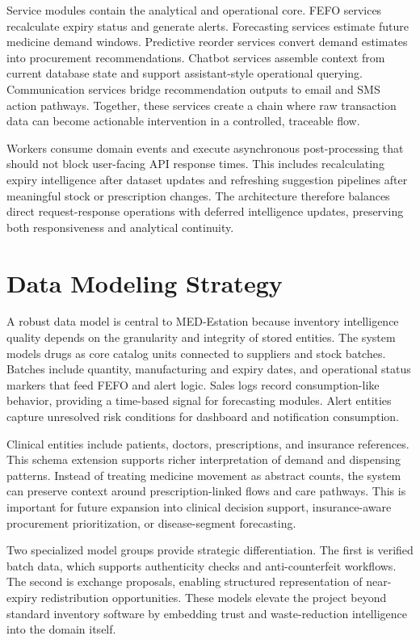 \documentclass[12pt,a4paper]{report}
\begin{document}
Service modules contain the analytical and operational core. FEFO services recalculate expiry status and generate alerts. Forecasting services estimate future medicine demand windows. Predictive reorder services convert demand estimates into procurement recommendations. Chatbot services assemble context from current database state and support assistant-style operational querying. Communication services bridge recommendation outputs to email and SMS action pathways. Together, these services create a chain where raw transaction data can become actionable intervention in a controlled, traceable flow.

Workers consume domain events and execute asynchronous post-processing that should not block user-facing API response times. This includes recalculating expiry intelligence after dataset updates and refreshing suggestion pipelines after meaningful stock or prescription changes. The architecture therefore balances direct request-response operations with deferred intelligence updates, preserving both responsiveness and analytical continuity.

\chapter{Data Modeling Strategy}
A robust data model is central to MED-Estation because inventory intelligence quality depends on the granularity and integrity of stored entities. The system models drugs as core catalog units connected to suppliers and stock batches. Batches include quantity, manufacturing and expiry dates, and operational status markers that feed FEFO and alert logic. Sales logs record consumption-like behavior, providing a time-based signal for forecasting modules. Alert entities capture unresolved risk conditions for dashboard and notification consumption.

Clinical entities include patients, doctors, prescriptions, and insurance references. This schema extension supports richer interpretation of demand and dispensing patterns. Instead of treating medicine movement as abstract counts, the system can preserve context around prescription-linked flows and care pathways. This is important for future expansion into clinical decision support, insurance-aware procurement prioritization, or disease-segment forecasting.

Two specialized model groups provide strategic differentiation. The first is verified batch data, which supports authenticity checks and anti-counterfeit workflows. The second is exchange proposals, enabling structured representation of near-expiry redistribution opportunities. These models elevate the project beyond standard inventory software by embedding trust and waste-reduction intelligence into the domain itself.
\end{document}
